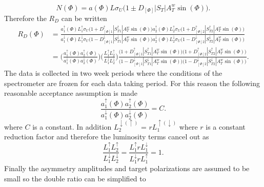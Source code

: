 \begin{equation}
  \label{equ::spindependentCounts}
  N(\Phi) = a(\Phi)L\sigma_U\Big(1 \pm D_{[\Phi]}|S_T|A^w_T\sin(\Phi)\Big).
\end{equation}
\noindent
Therefore the $R_D$ can be written
\begin{align}
  R_D(\Phi) &= \frac{ a_1^{\uparrow}(\Phi)L_1^{\uparrow}\sigma_U\Big(1 +
    D_{[\Phi]1}^{\uparrow}|S_{T1}^{\uparrow}|A^w_T\sin(\Phi)\Big)
    a_2^{\uparrow}(\Phi)L_2^{\uparrow}\sigma_U\Big(1 +
    D_{[\Phi]2}^{\uparrow}|S_{T2}^{\uparrow}|A^w_T\sin(\Phi)\Big) } {
    a_1^{\downarrow}(\Phi)L_1^{\downarrow}\sigma_U\Big(1 -
    D_{[\Phi]1}^{\downarrow}|S_{T1}^{\downarrow}|A^w_T\sin(\Phi)\Big)
    a_2^{\downarrow}(\Phi)L_2^{\downarrow}\sigma_U\Big(1 -
    D_{[\Phi]2}^{\downarrow}|S_{T2}^{\downarrow}|A^w_T\sin(\Phi)\Big) }
  \\ \nonumber &= \Big(\frac{a_1^{\uparrow}(\Phi)a_2^{\uparrow}(\Phi)}
     {a_1^{\downarrow}(\Phi)a_2^{\downarrow}(\Phi)} \Big)
     \Big(\frac{L_1^{\uparrow}L_2^{\uparrow}}
         {L_1^{\downarrow}L_2^{\downarrow}}\Big)
         \frac{\Big(1+D_{[\Phi]1}^{\uparrow}|S_{T1}^{\uparrow}|A^w_T\sin(\Phi)\Big)
           \Big(1+D_{[\Phi]2}^{\uparrow}|S_{T2}^{\uparrow}|A^w_T\sin(\Phi)\Big)}
              {\Big(1-D_{[\Phi]1}^{\downarrow}|S_{T1}^{\downarrow}|A^w_T\sin(\Phi)\Big)
                \Big(1-D_{[\Phi]2}^{\downarrow}|S_{T2}^{\downarrow}|A^w_T\sin(\Phi)\Big)
              }.
\end{align}
\noindent
The data is collected in two week periods where the conditions of the
spectrometer are frozen for each data taking period.  For this reason the
following reasonable acceptance assumption is made
\begin{equation}
  \label{equ::a_resonable_assump}
  \frac{a_1^\uparrow(\Phi) a_2^\uparrow(\Phi)}
       {a_1^\downarrow(\Phi) a_2^\downarrow(\Phi)}
       = C.
\end{equation}
\noindent
where $C$ is a constant.  In addition
$L^{\downarrow(\uparrow)}_2$ = $rL^{\uparrow(\downarrow)}_1$ where $r$ is a
constant reduction factor and therefore the luminosity terms cancel out as
\begin{equation}
  \frac{L_1^{\uparrow}L_2^{\uparrow}}{L_1^{\downarrow}L_2^{\downarrow}}
  = \frac{L_1^{\uparrow}rL_1^{\downarrow}}{L_1^{\downarrow}rL_1^{\uparrow}}
  = 1.
\end{equation}
\noindent
Finally the asymmetry amplitudes and target polarizations are assumed to be
small so the double ratio can be simplified to

